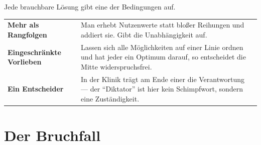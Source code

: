 \begin{merksatz}
Jede brauchbare Lösung gibt eine der Bedingungen auf.

\begin{center}
{\small
\renewcommand{\arraystretch}{1.55}
\begin{tabular}{@{}P{2.8cm}P{5.8cm}@{}}
\toprule
\textbf{Mehr als Rangfolgen} & Man erhebt Nutzenwerte statt bloßer Reihungen und addiert sie. Gibt die Unabhängigkeit auf.\\
\textbf{Eingeschränkte Vorlieben} & Lassen sich alle Möglichkeiten auf einer Linie ordnen und hat jeder ein Optimum darauf, so entscheidet die Mitte widerspruchsfrei.\\
\textbf{Ein Entscheider} & In der Klinik trägt am Ende einer die Verantwortung --- der \enquote{Diktator} ist hier kein Schimpfwort, sondern eine Zuständigkeit.\\
\bottomrule
\end{tabular}}
\end{center}

\begin{center}
\begin{minipage}{0.88\textwidth}
\end{minipage}
\end{center}
\end{merksatz}

\section{Der Bruchfall}

